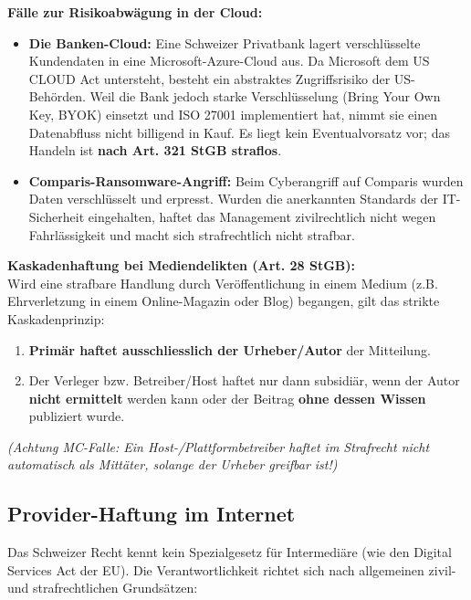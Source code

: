 \begin{example}
    \textbf{Fälle zur Risikoabwägung in der Cloud:}
    \begin{itemize}
        \item \textbf{Die Banken-Cloud:} Eine Schweizer Privatbank lagert verschlüsselte Kundendaten in eine Microsoft-Azure-Cloud aus. Da Microsoft dem US CLOUD Act untersteht, besteht ein abstraktes Zugriffsrisiko der US-Behörden. Weil die Bank jedoch starke Verschlüsselung (Bring Your Own Key, BYOK) einsetzt und ISO 27001 implementiert hat, nimmt sie einen Datenabfluss nicht billigend in Kauf. Es liegt kein Eventualvorsatz vor; das Handeln ist \textbf{nach Art. 321 StGB straflos}.
        \item \textbf{Comparis-Ransomware-Angriff:} Beim Cyberangriff auf Comparis wurden Daten verschlüsselt und erpresst. Wurden die anerkannten Standards der IT-Sicherheit eingehalten, haftet das Management zivilrechtlich nicht wegen Fahrlässigkeit und macht sich strafrechtlich nicht strafbar.
    \end{itemize}
\end{example}

\begin{definition}
    \textbf{Kaskadenhaftung bei Mediendelikten (Art. 28 StGB):} \\
    Wird eine strafbare Handlung durch Veröffentlichung in einem Medium (z.B. Ehrverletzung in einem Online-Magazin oder Blog) begangen, gilt das strikte Kaskadenprinzip:
    \begin{enumerate}
        \item \textbf{Primär haftet ausschliesslich der Urheber/Autor} der Mitteilung.
        \item Der Verleger bzw. Betreiber/Host haftet nur dann subsidiär, wenn der Autor \textbf{nicht ermittelt} werden kann oder der Beitrag \textbf{ohne dessen Wissen} publiziert wurde.
    \end{enumerate}
    \textit{(Achtung MC-Falle: Ein Host-/Plattformbetreiber haftet im Strafrecht nicht automatisch als Mittäter, solange der Urheber greifbar ist!)}
\end{definition}

\subsection{Provider-Haftung im Internet}

Das Schweizer Recht kennt kein Spezialgesetz für Intermediäre (wie den Digital Services Act der EU). Die Verantwortlichkeit richtet sich nach allgemeinen zivil- und strafrechtlichen Grundsätzen:

